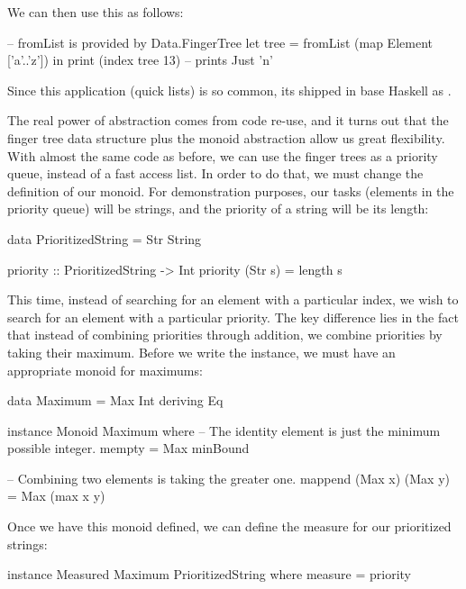 We can then use this as follows:
\begin{haskell}
-- fromList is provided by Data.FingerTree
let tree = fromList (map Element ['a'..'z']) in
  print (index tree 13) -- prints Just 'n'
\end{haskell}
Since this application (quick lists) is so common, its shipped in base Haskell as .

The real power of abstraction comes from code re-use, and it turns out that the finger tree data
structure plus the monoid abstraction allow us great flexibility. With almost the same code as
before, we can use the finger trees as a priority queue, instead of a fast access list. In order to
do that, we must change the definition of our monoid. For demonstration purposes, our tasks
(elements in the priority queue) will be strings, and the priority of a string will be its length:
\begin{haskell}
data PrioritizedString = Str String
    
priority :: PrioritizedString -> Int
priority (Str s) = length s
\end{haskell}
This time, instead of searching for an element with a particular index, we wish to search for an
element with a particular priority. The key difference lies in the fact that instead of combining
priorities through addition, we combine priorities by taking their maximum. Before we write the
 instance, we must have an appropriate monoid for maximums:
\begin{haskell}
data Maximum = Max Int deriving Eq

instance Monoid Maximum where
  -- The identity element is just the minimum possible integer.
  mempty = Max minBound

  -- Combining two elements is taking the greater one.
  mappend (Max x) (Max y) = Max (max x y)
\end{haskell}
Once we have this monoid defined, we can define the measure for our prioritized strings:
\begin{haskell}
instance Measured Maximum PrioritizedString where
  measure = priority
\end{haskell}

